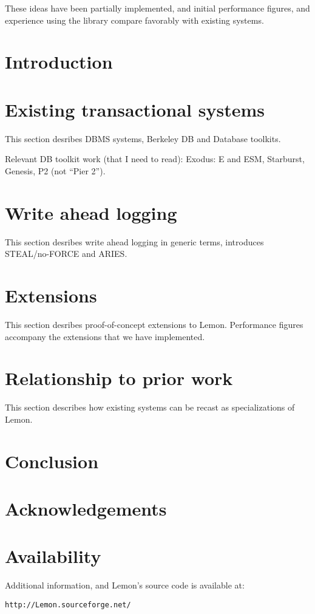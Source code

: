\documentclass[letterpaper,twocolumn,10pt]{article}
\newcommand{\yad}{Lemon\xspace}
\begin{document}
These ideas have been partially implemented, and initial performance
figures, and experience using the library compare favorably with
existing systems.


\section{Introduction}

\section{Existing transactional systems}

This section desribes DBMS systems, Berkeley DB and Database toolkits.
 
Relevant DB toolkit work (that I need to read): Exodus: E and ESM, Starburst,
Genesis, P2 (not ``Pier 2'').

\section{Write ahead logging}

This section desribes write ahead logging in generic terms, introduces
STEAL/no-FORCE and ARIES.

\section{Extensions}

This section desribes proof-of-concept extensions to \yad.
Performance figures accompany the extensions that we have implemented.

\section{Relationship to prior work}

This section describes how existing systems can be recast as
specializations of \yad.

\section{Conclusion}

\section{Acknowledgements}

\section{Availability}

Additional information, and \yad's source code is available at:

\begin{center}
{\tt http://\yad.sourceforge.net/}
\end{center}

{\footnotesize 
\nocite{*}
}

\theendnotes
\end{document}
